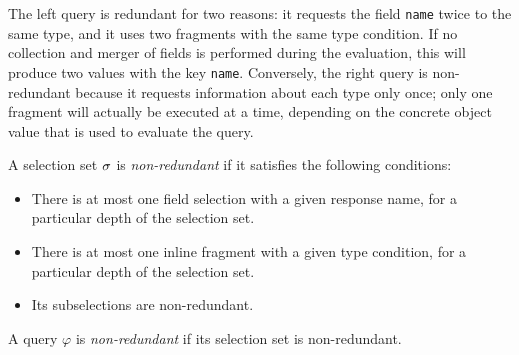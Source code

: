 The left query is redundant for two reasons: it requests the field \texttt{name} twice to the same type, and it uses two fragments with the same type condition. If no collection and merger of fields is performed during the evaluation, this will produce two values with the key \texttt{name}. 
Conversely, the right query is non-redundant because it requests information about each type only once; only one fragment will actually be executed at a time, depending on the concrete object value that is used to evaluate the query.

\begin{definition}
A \gql selection set $\sigma$ is \textit{non-redundant} if it satisfies the following conditions:
\begin{itemize}
    \item There is at most one field selection with a given response name, for a particular depth of the selection set.

    \item There is at most one inline fragment with a given type condition, for a particular depth of the selection set.
    
    \item Its subselections are non-redundant.
\end{itemize}
\end{definition}

\begin{definition}
A \gql query $\varphi$ is \textit{non-redundant} if its selection set is non-redundant.
\end{definition}



